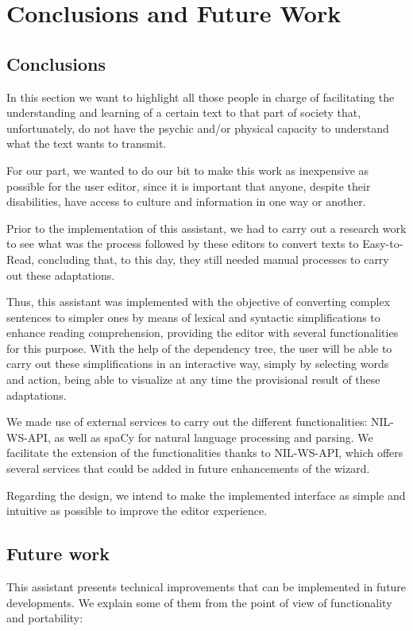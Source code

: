 \chapter{Conclusions and Future Work}
\label{cap:conclusions}

\section{Conclusions}
In this section we want to highlight all those people in charge of facilitating the understanding and learning of a certain text to that part of society that, unfortunately, do not have the psychic and/or physical capacity to understand what the text wants to transmit.

For our part, we wanted to do our bit to make this work as inexpensive as possible for the user editor, since it is important that anyone, despite their disabilities, have access to culture and information in one way or another.

Prior to the implementation of this assistant, we had to carry out a research work to see what was the process followed by these editors to convert texts to Easy-to-Read, concluding that, to this day, they still needed manual processes to carry out these adaptations.

Thus, this assistant was implemented with the objective of converting complex sentences to simpler ones by means of lexical and syntactic simplifications to enhance reading comprehension, providing the editor with several functionalities for this purpose. With the help of the dependency tree, the user will be able to carry out these simplifications in an interactive way, simply by selecting words and action, being able to visualize at any time the provisional result of these adaptations.

We made use of external services to carry out the different functionalities: NIL-WS-API, as well as spaCy for natural language processing and parsing. We facilitate the extension of the functionalities thanks to NIL-WS-API, which offers several services that could be added in future enhancements of the wizard.

Regarding the design, we intend to make the implemented interface as simple and intuitive as possible to improve the editor experience.

\section{Future work}
This assistant presents technical improvements that can be implemented in future developments. We explain some of them from the point of view of functionality and portability:

